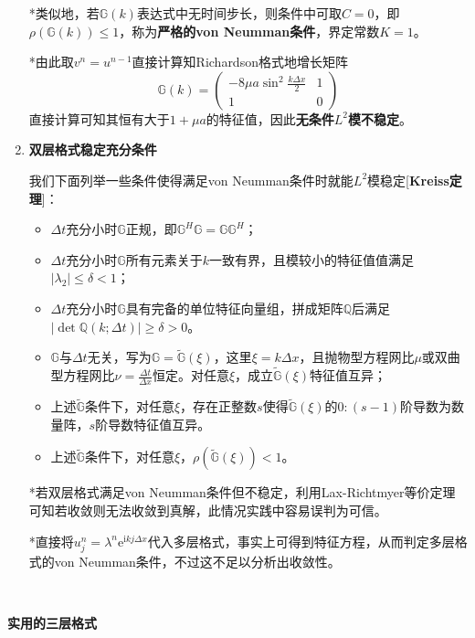 \documentclass[a4paper,UTF8,fontset=windows]{ctexart}
\begin{document}
\begin{enumerate}
    *类似地，若$\mathbb{G}(k)$表达式中无时间步长，则条件中可取$C=0$，即$\rho(\mathbb{G}(k))\le1$，称为\textbf{严格的von Neumman条件}，界定常数$K=1$。

    *由此取$v^n=u^{n-1}$直接计算知Richardson格式地增长矩阵
    $$\mathbb{G}(k)=\begin{pmatrix}-8\mu a\sin^2\frac{k\Delta x}{2}&1\\1&0\end{pmatrix}$$
    直接计算可知其恒有大于$1+\mu a$的特征值，因此\textbf{无条件$L^2$模不稳定}。

    \item \textbf{双层格式稳定充分条件}
    
    我们下面列举一些条件使得满足von Neumman条件时就能$L^2$模稳定[\textbf{Kreiss定理}]：

    \begin{itemize}
        \item $\Delta t$充分小时$\mathbb{G}$正规，即$\mathbb{G}^H\mathbb{G}=\mathbb{G}\mathbb{G}^H$；
        \item  $\Delta t$充分小时$\mathbb{G}$所有元素关于$k$一致有界，且模较小的特征值值满足$|\lambda_2|\le\delta<1$；
        \item $\Delta t$充分小时$\mathbb{G}$具有完备的单位特征向量组，拼成矩阵$\mathbb{Q}$后满足$|\det\mathbb{Q}(k;\Delta t)|\ge\delta>0$。
        \item $\mathbb{G}$与$\Delta t$无关，写为$\mathbb{G}=\tilde{\mathbb{G}}(\xi)$，这里$\xi=k\Delta x$，且抛物型方程网比$\mu$或双曲型方程网比$\nu=\frac{\Delta t}{\Delta x}$恒定。对任意$\xi$，成立$\tilde{\mathbb{G}}(\xi)$特征值互异；
        \item 上述$\tilde{\mathbb{G}}$条件下，对任意$\xi$，存在正整数$s$使得$\tilde{\mathbb{G}}(\xi)$的$0:(s-1)$阶导数为数量阵，$s$阶导数特征值互异。
        \item 上述$\tilde{\mathbb{G}}$条件下，对任意$\xi$，$\rho(\tilde{\mathbb{G}}(\xi))<1$。
    \end{itemize}

    *若双层格式满足von Neumman条件但不稳定，利用Lax-Richtmyer等价定理可知若收敛则无法收敛到真解，此情况实践中容易误判为可信。

    *直接将$u_j^n=\lambda^n\mathrm{e}^{\mathrm{i}kj\Delta x}$代入多层格式，事实上可得到特征方程，从而判定多层格式的von Neumman条件，不过这不足以分析出收敛性。
\end{enumerate}

\

\textbf{实用的三层格式}
\end{document}
